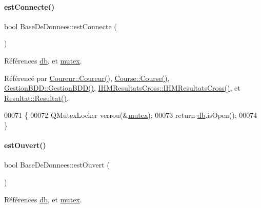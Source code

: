 \paragraph{\texorpdfstring{est\+Connecte()}{estConnecte()}}
{\footnotesize\ttfamily bool Base\+De\+Donnees\+::est\+Connecte (\begin{DoxyParamCaption}{ }\end{DoxyParamCaption})}



Références \hyperlink{class_base_de_donnees_a3e738dcf443370c46a541677ab619f06}{db}, et \hyperlink{class_base_de_donnees_aa1b4696fac87a740f914aa73739086f2}{mutex}.



Référencé par \hyperlink{class_coureur_af3a5607d96a0960b1666164f6a74d539}{Coureur\+::\+Coureur()}, \hyperlink{class_course_af6317ecab95f8a2eb205b4f91b530992}{Course\+::\+Course()}, \hyperlink{class_gestion_b_d_d_a406bdb9b1714b204fa6fab015baffc27}{Gestion\+B\+D\+D\+::\+Gestion\+B\+D\+D()}, \hyperlink{class_i_h_m_resultats_cross_a94afa0356ebc98e497dfecca3e1bb00b}{I\+H\+M\+Resultats\+Cross\+::\+I\+H\+M\+Resultats\+Cross()}, et \hyperlink{class_resultat_a57e458f7abfc7463786ae9212bf55cd5}{Resultat\+::\+Resultat()}.


\begin{DoxyCode}
00071 \{
00072     QMutexLocker verrou(&\hyperlink{class_base_de_donnees_aa1b4696fac87a740f914aa73739086f2}{mutex});
00073     \textcolor{keywordflow}{return} \hyperlink{class_base_de_donnees_a3e738dcf443370c46a541677ab619f06}{db}.isOpen();
00074 \}
\end{DoxyCode}
\mbox{\label{class_base_de_donnees_af9ac332082ffd0dd35e412cefabe5e9c}} 
\paragraph{\texorpdfstring{est\+Ouvert()}{estOuvert()}}
{\footnotesize\ttfamily bool Base\+De\+Donnees\+::est\+Ouvert (\begin{DoxyParamCaption}{ }\end{DoxyParamCaption})}



Références \hyperlink{class_base_de_donnees_a3e738dcf443370c46a541677ab619f06}{db}, et \hyperlink{class_base_de_donnees_aa1b4696fac87a740f914aa73739086f2}{mutex}.


